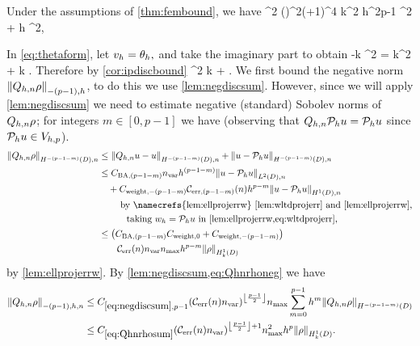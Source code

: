 \label{lem:boundarybound}
Under the assumptions of \cref{thm:fembound}, we have
\beq\label{eq:boundarybound}
\NLtGI{\thetah}^2 \leq \Cboundaryo \mleft(\En\nvar\mright)^{2\mleft(+1\mright)}\nmax^4 k^2 h^{2p-1} ^2 + \Cboundaryt h \NHokD{\rho}^2,
\eeq
\ele

In \cref{eq:thetaform}, let $v_{h} = \theta_{h},$ and take the imaginary part to obtain
\beq\label{eq:boundboundarybelow}
-k \NLtGI{\thetah}^2 = \Im k^2 \IPLtDn{\Qhn \rho}{\thetah} + \Re k \IPLtGI{\rho}{\thetah}.
\eeq
Therefore by \cref{cor:ipdiscbound}
\beq
\NLtGI{\thetah}^2 \leq  k  + \NLtGI{\rho}\NLtGI{\thetah}.\label{eq:thetaboundarypart}
\eeq
We first bound the negative norm $\Nfn{-(p-1),h}{\Qhn\rho}$, to do this we use \cref{lem:negdiscsum}. However, since we will apply \cref{lem:negdiscsum} we need to estimate negative (standard) Sobolev norms of $Q_{h,n}\rho$; for integers $m \in [0,p-1]$ we have (observing that $Q_{h,n} \mathcal P_{h} u = \mathcal P_{h} u$ since $\mathcal P_{h} u \in V_{h,p}$).
\begin{align}
\NHnfn{-(p-1-m)}{D}{\Qhn\rho} &\leq \NHnfn{-(p-1-m)}{D}{\Qhn u - u} + \NHnfn{-(p-1-m)}{D}{u - \Ph u}\nonumber\\
&\leq \CSZfn{(p-1-m)} \nvar h^{(p-1-m)} \NLtDn{u-\Ph u}\nonumber\\
&\quad+ \Cwfn{-(p-1-m)}\errn{(p-1-m)} h^{p-m} \NHoDn{u - \Ph u}\nonumber\\
&\quad\quad\text{ by \namecrefs{lem:ellprojerrw} \ref{lem:wltdprojerr} and \ref{lem:ellprojerrw},}\nonumber\\
&\quad\quad\quad\text{taking } \wh = \Ph u \text{ in \cref{lem:ellprojerrw,eq:wltdprojerr},}\nonumber\\
&\leq \mleft(\CSZfn{(p-1-m)} \Cwz + \Cwfn{-(p-1-m)}\mright)\nonumber\\
&\quad\quad\En\nvar\nmax h^{p-m} \NHokD{\rho}\label{eq:Qhnrhoneg}
\end{align}
by \cref{lem:ellprojerrw}. By \cref{lem:negdiscsum,eq:Qhnrhoneg} we have
\begin{align}
\Nfn{-(p-1),h,n}{\Qhn \rho}&\leq \Csumfn{p-1} \mleft(\En\nvar\mright)^{\floor{\frac{p-1}2}}\nmax \sum_{m=0}^{p-1} h^{m} \NHfn{-(p-1-m)}{D}{\Qhn \rho} \nonumber\\
&\leq \Cmess \mleft(\En\nvar\mright)^{\floor{\frac{p-1}2}+1}\nmax^2 h^p \NHokD{\rho}.\label{eq:Qhnrhosum}
\end{align}

